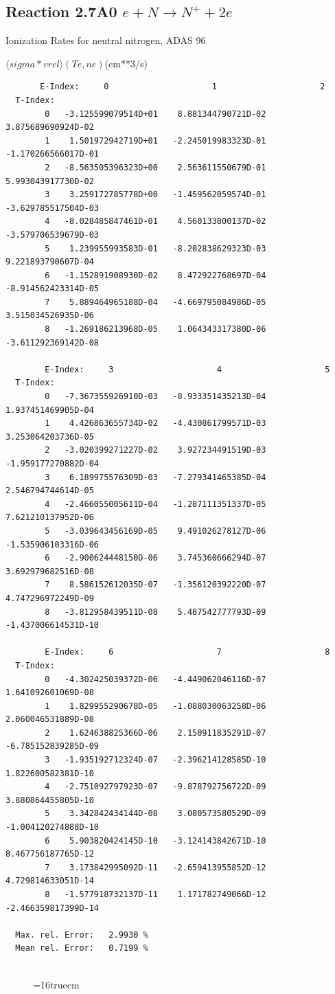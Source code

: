 \documentclass[12pt,dvips]{article}
\begin{document}
\subsection{
Reaction 2.7A0 $e + N \rightarrow N^+  + 2e $ }
  Ionization Rates for neutral  nitrogen,   ADAS 96

$  \langle sigma*vrel \rangle(Te,ne) $(cm**3/s)
\begin{small}\begin{verbatim}
       E-Index:     0                     1                     2
  T-Index:
        0   -3.125599079514D+01    8.881344790721D-02    3.875689690924D-02
        1    1.501972942719D+01   -2.245019983323D-01   -1.170266566017D-01
        2   -8.563505396323D+00    2.563611550679D-01    5.993043917730D-02
        3    3.259172785778D+00   -1.459562059574D-01   -3.629785517504D-03
        4   -8.028485847461D-01    4.560133800137D-02   -3.579706539679D-03
        5    1.239955993583D-01   -8.202838629323D-03    9.221893790607D-04
        6   -1.152891908930D-02    8.472922768697D-04   -8.914562423314D-05
        7    5.889464965188D-04   -4.669795084986D-05    3.515034526935D-06
        8   -1.269186213968D-05    1.064343317380D-06   -3.611292369142D-08

        E-Index:     3                     4                     5
  T-Index:
        0   -7.367355926910D-03   -8.933351435213D-04    1.937451469905D-04
        1    4.426863655734D-02   -4.430861799571D-03    3.253064203736D-05
        2   -3.020399271227D-02    3.927234491519D-03   -1.959177270882D-04
        3    6.189975576309D-03   -7.279341465385D-04    2.546794744614D-05
        4   -2.466055005611D-04   -1.287111351337D-05    7.621210137952D-06
        5   -3.039643456169D-05    9.491026278127D-06   -1.535906103316D-06
        6   -2.900624448150D-06    3.745360666294D-07    3.692979682516D-08
        7    8.586152612035D-07   -1.356120392220D-07    4.747296972249D-09
        8   -3.812958439511D-08    5.487542777793D-09   -1.437006614531D-10

        E-Index:     6                     7                     8
  T-Index:
        0   -4.302425039372D-06   -4.449062046116D-07    1.641092601069D-08
        1    1.829955290678D-05   -1.088030063258D-06    2.060046531889D-08
        2    1.624638825366D-06    2.150911835291D-07   -6.785152839285D-09
        3   -1.935192712324D-07   -2.396214128585D-10    1.822600582381D-10
        4   -2.751092797923D-07   -9.878792756722D-09    3.880864455805D-10
        5    3.342842434144D-08    3.080573580529D-09   -1.004120274888D-10
        6    5.903820424145D-10   -3.124143842671D-10    8.467756187765D-12
        7    3.173842995092D-11   -2.659413955852D-12    4.729814633051D-14
        8   -1.577918732137D-11    1.171782749066D-12   -2.466359817399D-14

  Max. rel. Error:   2.9930 %
  Mean rel. Error:   0.7199 %


\end{verbatim}\end{small}
\begin{figure} \label{2.7A0}
\epsfxsize=16truecm 
\end{figure}
\newpage
\end{document}
